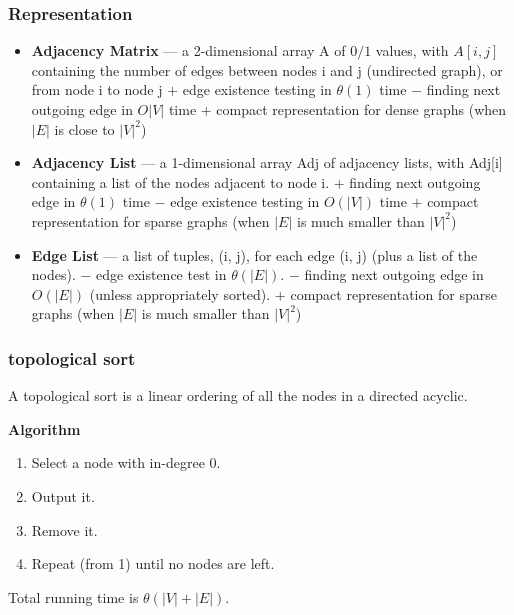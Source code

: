 \begin{multicols}{2}
\subsubsection{Representation}
\begin{itemize}
\item \textbf{Adjacency Matrix} — a 2-dimensional array A of $0/1$ values, with $A[i, j]$
  containing the number of edges between nodes i and j (undirected graph),
  or from node i to node j \newline
  $+$ edge existence testing in $\theta(1)$ time \newline
  $-$ finding next outgoing edge in $O|V|$ time \newline 
  $+$ compact representation for dense graphs (when $|E|$ is close to $|V|^2$)
\item \textbf{Adjacency List} — a 1-dimensional array Adj of adjacency lists, with 
  Adj[i] containing a list of the nodes adjacent to node i. \newline
  $+$ finding next outgoing edge in $\theta(1)$ time \newline
  $-$ edge existence testing in $O (|V|)$ time \newline
  $+$ compact representation for sparse graphs (when $|E|$ is much smaller than $|V|^2$)
\item \textbf{Edge List} — a list of tuples, (i, j), for each edge (i, j) (plus a list of the nodes). \newline
  $-$ edge existence test in $\theta(|E|)$. \newline
  $-$ finding next outgoing edge in $O (|E|)$ (unless appropriately sorted). \newline
  $+$ compact representation for sparse graphs (when $|E|$ is much smaller than $|V|^2$)
\end{itemize}


\subsubsection{topological sort}
A topological sort is a linear ordering of all the nodes in a directed acyclic. \newline

\noindent\textbf{Algorithm}
\begin{enumerate}
\item Select a node with in-degree 0.
\item Output it.
\item Remove it.
\item Repeat (from 1) until no nodes are left.
\end{enumerate}
Total running time is $\theta(|V|+|E|)$.


\end{multicols}
